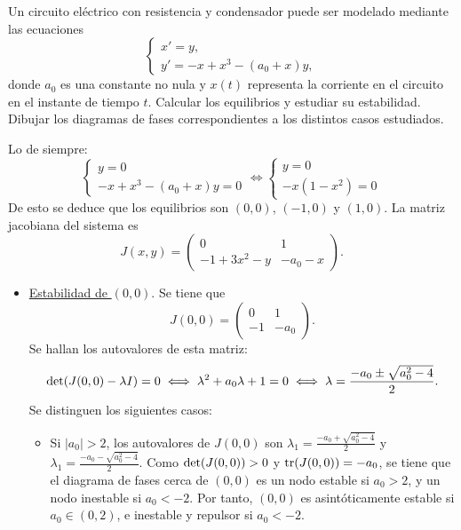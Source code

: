 \documentclass[11pt]{report}
\begin{document}
\addtocounter{exercise}{3}

\begin{exercise}
    Un circuito eléctrico con resistencia y condensador puede ser modelado mediante las ecuaciones
    \[\begin{cases}
        x' = y, \\
        y' = -x+x^3-(a_0+x)y,
    \end{cases}\]
    donde $a_0$ es una constante no nula y $x(t)$ representa la corriente en el circuito en el instante de tiempo $t$. Calcular los equilibrios y estudiar su estabilidad. Dibujar los diagramas de fases correspondientes a los distintos casos estudiados.
\end{exercise}

\begin{solution}
    Lo de siempre:
    \[
    \begin{cases}
        y = 0 \\
        -x+x^3-(a_0+x)y = 0
    \end{cases} \iff \begin{cases}
        y = 0 \\
        -x(1-x^2) = 0
    \end{cases}
    \]
    De esto se deduce que los equilibrios son $(0,0)$, $(-1,0)$ y $(1,0)$. La matriz jacobiana del sistema es
    \[J(x,y)=\left(\begin{array}{cc}
        0 & 1 \\
        -1+3x^2-y & -a_0-x
    \end{array}\right).\]
    \begin{itemize}
        \item \underline{Estabilidad de $(0,0)$}. Se tiene que
    \[J(0,0)=\left(\begin{array}{cc}
        0 & 1 \\
        -1 & -a_0
    \end{array}\right).\]
    Se hallan los autovalores de esta matriz:
    \[\textup{det}(J(0,0)-\lambda I) = 0 \iff \lambda^2+a_0\lambda+1=0 \iff \lambda = \frac{-a_0\pm\sqrt{a_0^2-4}}{2}.\]
    Se distinguen los siguientes casos:
    \begin{itemize}
        \item Si $|a_0|>2$, los autovalores de $J(0,0)$ son $\lambda_1 = \frac{-a_0+\sqrt{a_0^2-4}}{2}$ y $\lambda_1 = \frac{-a_0-\sqrt{a_0^2-4}}{2}$. Como $\textup{det}(J(0,0))>0$ y $\textup{tr}(J(0,0)) = -a_0$, se tiene que el diagrama de fases cerca de $(0,0)$ es un nodo estable si $a_0 > 2$, y un nodo inestable si $a_0 < -2$. Por tanto, $(0,0)$ es asintóticamente estable si $a_0\in(0,2)$, e inestable y repulsor si $a_0<-2$.

\end{itemize}
\end{itemize}
\end{solution}
\end{document}
